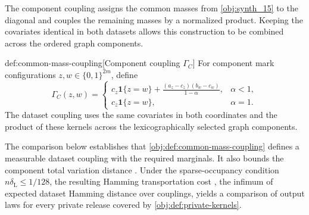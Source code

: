 \documentclass[11pt]{article}
\begin{document}
The component coupling  assigns the common masses from \cref{obj:synth_15} to the diagonal and couples the remaining masses by a normalized product. Keeping the covariates identical in both datasets allows this construction to be combined across the ordered graph components.

\begin{definitionv}{def:common-mass-coupling}[Component coupling \(\Gamma_C\)]
For component mark configurations \(z,w\in\{0,1\}^{2m}\), define
\[
\Gamma_C(z,w)
=
\begin{cases}
\displaystyle
c_z\mathbf 1\{z=w\}
+\frac{(a_z-c_z)(b_w-c_w)}{1-\alpha},
&\alpha<1,\\[6pt]
c_z\mathbf 1\{z=w\},
&\alpha=1.
\end{cases}
\]
The dataset coupling uses the same covariates in both coordinates and the product of these kernels across the lexicographically selected graph components.
\end{definitionv}

The comparison below establishes that \cref{obj:def:common-mass-coupling} defines a measurable dataset coupling with the required marginals. It also bounds the component total variation distance . Under the sparse-occupancy condition \(n\delta_{\mathrm L}\le1/128\), the resulting Hamming transportation cost , the infimum of expected dataset Hamming distance over couplings, yields a comparison of output laws for every private release covered by \cref{obj:def:private-kernels}.
\end{document}
